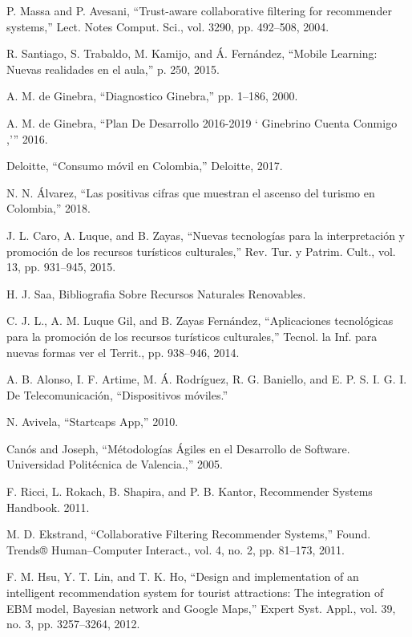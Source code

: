 \documentclass[12pt,letterpaper,openany]{book}
\begin{document}
\begin{thebibliography}{1}
 P. Massa and P. Avesani, “Trust-aware collaborative filtering for recommender systems,” Lect. Notes Comput. Sci., vol. 3290, pp. 492–508, 2004.

 R. Santiago, S. Trabaldo, M. Kamijo, and Á. Fernández, “Mobile Learning: Nuevas realidades en el aula,” p. 250, 2015.

 A. M. de Ginebra, “Diagnostico Ginebra,” pp. 1–186, 2000.

 A. M. de Ginebra, “Plan De Desarrollo 2016-2019 ‘ Ginebrino Cuenta Conmigo ,’” 2016.

 Deloitte, “Consumo móvil en Colombia,” Deloitte, 2017.

 N. N. Álvarez, “Las positivas cifras que muestran el ascenso del turismo en Colombia,” 2018. 

 J. L. Caro, A. Luque, and B. Zayas, “Nuevas tecnologías para la interpretación y promoción de los recursos turísticos culturales,” Rev. Tur. y Patrim. Cult., vol. 13, pp. 931–945, 2015.

 H. J. Saa, Bibliografia Sobre Recursos Naturales Renovables.

 C. J. L., A. M. Luque Gil, and B. Zayas Fernández, “Aplicaciones tecnológicas para la promoción de los recursos turísticos culturales,” Tecnol. la Inf. para nuevas formas ver el Territ., pp. 938–946, 2014.

 A. B. Alonso, I. F. Artime, M. Á. Rodríguez, R. G. Baniello, and E. P. S. I. G. I. De Telecomunicación, “Dispositivos móviles.”

 N. Avivela, “Startcaps App,” 2010.

 Canós and Joseph, “Métodologías Ágiles en el Desarrollo de Software. Universidad Politécnica de Valencia.,” 2005.

 F. Ricci, L. Rokach, B. Shapira, and P. B. Kantor, Recommender Systems Handbook. 2011.

 M. D. Ekstrand, “Collaborative Filtering Recommender Systems,” Found. Trends® Human–Computer Interact., vol. 4, no. 2, pp. 81–173, 2011.

 F. M. Hsu, Y. T. Lin, and T. K. Ho, “Design and implementation of an intelligent recommendation system for tourist attractions: The integration of EBM model, Bayesian network and Google Maps,” Expert Syst. Appl., vol. 39, no. 3, pp. 3257–3264, 2012.


\end{thebibliography}
\end{document}
